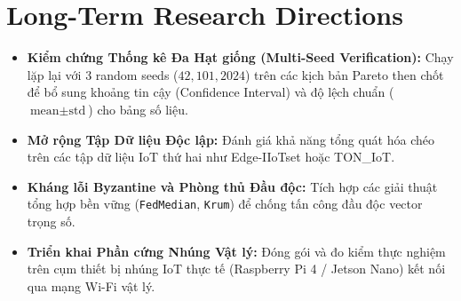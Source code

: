 \section{Long-Term Research Directions}
\label{sec:concl_future}
\begin{itemize}
    \item \textbf{Kiểm chứng Thống kê Đa Hạt giống (Multi-Seed Verification):} Chạy lặp lại với 3 random seeds ($42, 101, 2024$) trên các kịch bản Pareto then chốt để bổ sung khoảng tin cậy (Confidence Interval) và độ lệch chuẩn ($\text{mean} \pm \text{std}$) cho bảng số liệu.
    \item \textbf{Mở rộng Tập Dữ liệu Độc lập:} Đánh giá khả năng tổng quát hóa chéo trên các tập dữ liệu IoT thứ hai như Edge-IIoTset hoặc TON\_IoT.
    \item \textbf{Kháng lỗi Byzantine và Phòng thủ Đầu độc:} Tích hợp các giải thuật tổng hợp bền vững (\texttt{FedMedian}, \texttt{Krum}) để chống tấn công đầu độc vector trọng số.
    \item \textbf{Triển khai Phần cứng Nhúng Vật lý:} Đóng gói và đo kiểm thực nghiệm trên cụm thiết bị nhúng IoT thực tế (Raspberry Pi 4 / Jetson Nano) kết nối qua mạng Wi-Fi vật lý.
\end{itemize}